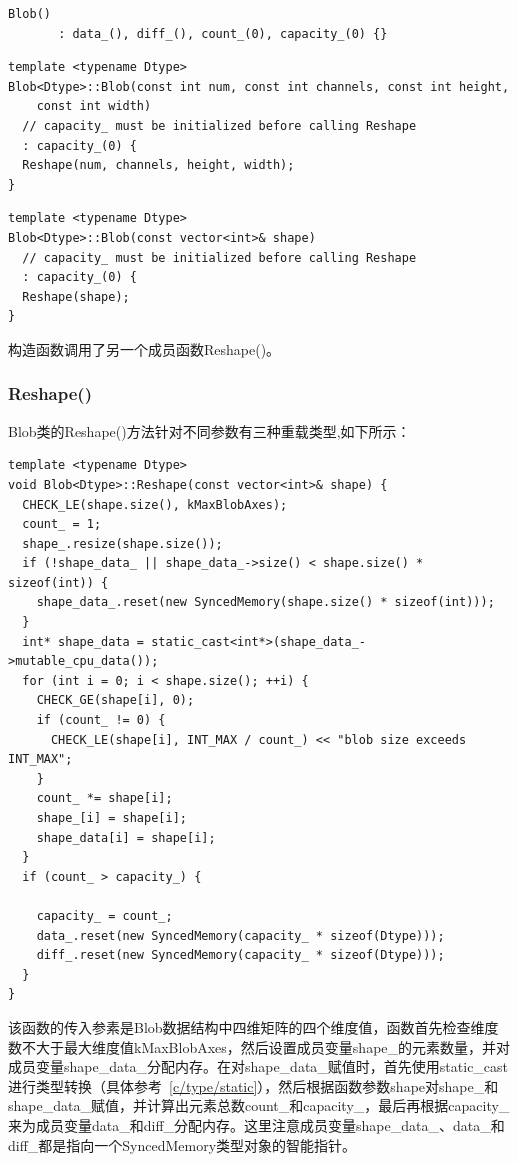 \noindent{}
\begin{verbatim}
Blob()
       : data_(), diff_(), count_(0), capacity_(0) {}
\end{verbatim}

\noindent{}
\begin{verbatim}
template <typename Dtype>
Blob<Dtype>::Blob(const int num, const int channels, const int height,
    const int width)
  // capacity_ must be initialized before calling Reshape
  : capacity_(0) {
  Reshape(num, channels, height, width);
}
\end{verbatim}

\noindent{}
\begin{verbatim}
template <typename Dtype>
Blob<Dtype>::Blob(const vector<int>& shape)
  // capacity_ must be initialized before calling Reshape
  : capacity_(0) {
  Reshape(shape);
}
\end{verbatim}
构造函数调用了另一个成员函数Reshape()。
\subsubsection{Reshape()}
Blob类的Reshape()方法针对不同参数有三种重载类型,如下所示：\\

\noindent{}
\begin{verbatim}
template <typename Dtype>
void Blob<Dtype>::Reshape(const vector<int>& shape) {
  CHECK_LE(shape.size(), kMaxBlobAxes);
  count_ = 1;
  shape_.resize(shape.size());
  if (!shape_data_ || shape_data_->size() < shape.size() * sizeof(int)) {
    shape_data_.reset(new SyncedMemory(shape.size() * sizeof(int)));
  }
  int* shape_data = static_cast<int*>(shape_data_->mutable_cpu_data());
  for (int i = 0; i < shape.size(); ++i) {
    CHECK_GE(shape[i], 0);
    if (count_ != 0) {
      CHECK_LE(shape[i], INT_MAX / count_) << "blob size exceeds INT_MAX";
    }
    count_ *= shape[i];
    shape_[i] = shape[i];
    shape_data[i] = shape[i];
  }
  if (count_ > capacity_) {
    
    capacity_ = count_;
    data_.reset(new SyncedMemory(capacity_ * sizeof(Dtype)));
    diff_.reset(new SyncedMemory(capacity_ * sizeof(Dtype)));
  }
}
\end{verbatim}
该函数的传入参素是Blob数据结构中四维矩阵的四个维度值，函数首先检查维度数不大于最大维度值kMaxBlobAxes，然后设置成员变量shape\_的元素数量，并对成员变量shape\_data\_分配内存。在对shape\_data\_赋值时，首先使用static\_cast进行类型转换（具体参考~\ref{c/type/static}），然后根据函数参数shape对shape\_和shape\_data\_赋值，并计算出元素总数count\_和capacity\_，最后再根据capacity\_来为成员变量data\_和diff\_分配内存。这里注意成员变量shape\_data\_、data\_和diff\_都是指向一个SyncedMemory类型对象的智能指针。\\

